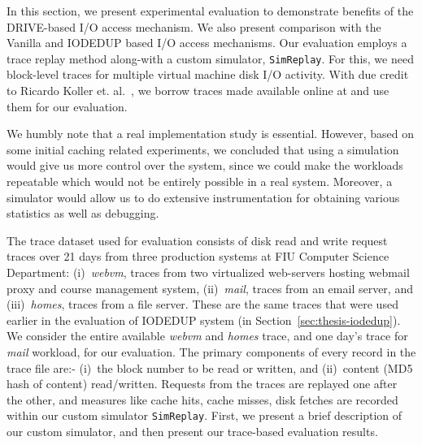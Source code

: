 

In this section, we present experimental evaluation to demonstrate benefits
of the DRIVE-based I/O access mechanism. We also present comparison with
the Vanilla and IODEDUP based I/O access mechanisms. Our evaluation
employs a trace replay method along-with a custom simulator, \texttt{SimReplay}.
For this, we need block-level traces for multiple virtual 
machine disk I/O activity. With due credit to Ricardo Koller 
et. al.~\cite{iodedup, iodedup-online},
we borrow traces made available online at \cite{iodedup-online}
and use them for our evaluation. 

We humbly note that a real implementation study is essential. However, based 
on some initial caching related experiments, we concluded that using a 
simulation would give us more control over the system, since we could make 
the workloads repeatable which would not be entirely possible in a real 
system. Moreover, a simulator would allow us to do extensive instrumentation 
for obtaining various statistics as well as debugging.

The trace dataset used for evaluation consists of
disk read and write request traces over 21 days from three production systems
at FIU Computer Science Department:
(i)~\textit{webvm}, traces from two virtualized web-servers hosting webmail
proxy and course management system, (ii)~\textit{mail}, traces from an
email server, and (iii)~\textit{homes}, traces from a file server.
These are the same traces that were
used earlier in the evaluation of IODEDUP system (in Section~\ref{sec:thesis-iodedup}).
We consider the entire available \textit{webvm}
and \textit{homes} trace, and one day's trace for \textit{mail} workload,
for our evaluation. 
The primary components of every record in the trace file are:-
(i)~the block number to be read or written, and 
(ii)~content (MD5 hash of content) read/written.
Requests from the traces are replayed one after the other, and 
measures like cache hits, cache misses, disk fetches are recorded within
our custom simulator \texttt{SimReplay}. 
First, we present a brief description of our custom simulator, 
and then present our trace-based evaluation results.

